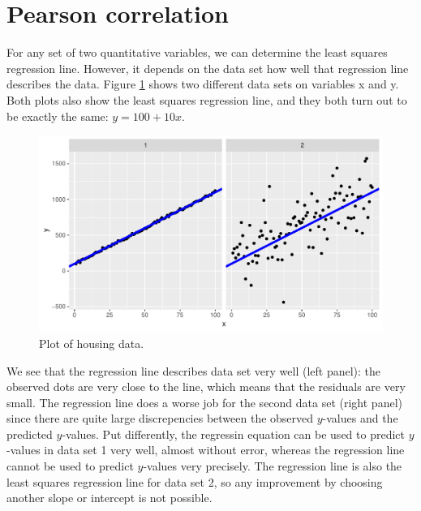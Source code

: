 \documentclass[]{report}\usepackage[]{graphicx}\usepackage[]{color}
\makeatletter
\def\maxwidth{ %
  \ifdim\Gin@nat@width>\linewidth
    \linewidth
  \else
    \Gin@nat@width
  \fi
}
\newenvironment{knitrout}{}{} %
\makeatother
\begin{document}
\section{Pearson correlation}

For any set of two quantitative variables, we can determine the least squares regression line. However, it depends on the data set how well that regression line describes the data.
Figure \ref{fig:lm_18} shows two different data sets on variables x and y. Both plots also show the least squares regression line, and they both turn out to be exactly the same: $y=100+10x$.

\begin{knitrout}
\color{fgcolor}\begin{figure}

{\centering \includegraphics[width=\maxwidth]{figure/lm_18-1} 

}

\caption[Plot of housing data]{Plot of housing data.}\label{fig:lm_18}
\end{figure}


\end{knitrout}


We see that the regression line describes data set very well (left panel): the observed dots are very close to the line, which means that the residuals are very small. The regression line does a worse job for the second data set (right panel) since there are quite large discrepencies between the observed $y$-values and the predicted $y$-values. Put differently, the regressin equation can be used to predict $y$-values in data set 1 very well, almost without error, whereas the regression line cannot be used to predict $y$-values very precisely. The regression line is also the least squares regression line for data set 2, so any improvement by choosing another slope or intercept is not possible.
\end{document}
